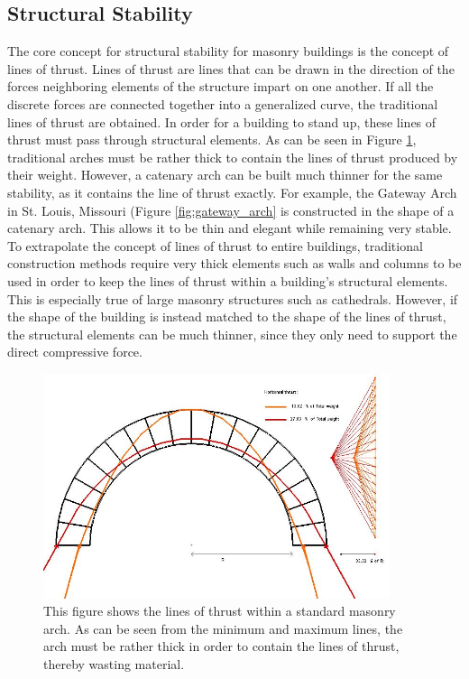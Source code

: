 \documentclass{thesis}
\begin{document}
\subsection{Structural Stability} \label{sec:stability}
The core concept for structural stability for masonry buildings is the concept of lines of thrust.  Lines of thrust are lines that can be drawn
in the direction of the forces neighboring elements of the structure impart on one another.  If all the discrete forces are connected together
into a generalized curve, the traditional lines of thrust are obtained.
In order for a building to stand up, these lines of thrust must pass through structural elements.  As can be seen in Figure \ref{fig:arch_lines},
traditional arches must be rather thick to contain the lines of thrust produced by their weight.  However, a catenary arch can be built
much thinner for the same stability, as it contains the line of thrust exactly.  For example, the Gateway Arch in St. Louis, Missouri (Figure
\ref{fig:gateway_arch} is constructed in the shape of a catenary arch.  This allows it to be thin and elegant while remaining very stable.
To extrapolate the concept of lines of thrust to entire buildings, traditional construction methods require very thick elements such as walls
and columns to be used in order to keep the lines of thrust within a building's structural elements.  This is especially true of large masonry
structures such as cathedrals.  However, if the shape of the building is instead matched to
the shape of the lines of thrust, the structural elements can be much thinner, since they only need to support the direct compressive force.
\begin{figure}
\centering
\includegraphics[width=4in]{images/arch.png}
\caption[Lines of thrust]{This figure shows the lines of thrust within a standard masonry arch.  As can be seen from the minimum and maximum
lines, the arch must be rather thick in order to contain the lines of thrust, thereby wasting material. \cite{img:thrust}}
\label{fig:arch_lines}
\end{figure}
\end{document}
